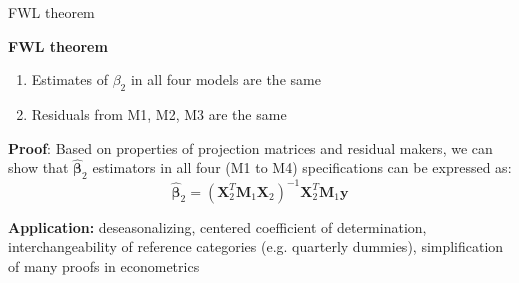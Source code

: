 \documentclass{beamer}
\begin{document}

\begin{frame}{FWL theorem}

\textbf{FWL theorem}

\begin{enumerate}
\item Estimates of $\beta_2$ in all four models are the same
\item Residuals from M1, M2, M3 are the same
\end{enumerate}
\vspace{0.5cm}
\textbf{Proof}: Based on properties of projection matrices and residual makers, we can show that  $\bm{\hat{\beta}}_2$ estimators in all four (M1 to M4) specifications can be expressed as: 
$$\bm{\hat{\beta}}_2 = (\bm{X}_2^T\bm{M}_1 \bm{X}_2)^{-1}\bm{X}_2^T\bm{M}_1\bm{y} $$

\textbf{Application:} deseasonalizing, centered coefficient of determination, interchangeability of reference categories (e.g. quarterly dummies), simplification of many proofs in econometrics
\end{frame}

%
\end{document}
